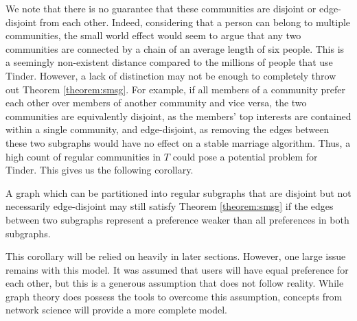 We note that there is no guarantee that these communities are disjoint or edge-disjoint from each other. Indeed, considering that a person can belong to multiple communities, the small world effect \citep{Newman2003} would seem to argue that any two communities are connected by a chain of an average length of six people. This is a seemingly non-existent distance compared to the millions of people that use Tinder. However, a lack of distinction may not be enough to completely throw out Theorem \ref{theorem:smsg}. For example, if all members of a community prefer each other over members of another community and vice versa, the two communities are equivalently disjoint, as the members' top interests are contained within a single community, and edge-disjoint, as removing the edges between these two subgraphs would have no effect on a stable marriage algorithm. Thus, a high count of regular communities in $T$ could pose a potential problem for Tinder. This gives us the following corollary.

\begin{corollary}
\label{corollary:subgraphs}
A graph which can be partitioned into regular subgraphs that are disjoint but not necessarily edge-disjoint may still satisfy Theorem \ref{theorem:smsg} if the edges between two subgraphs represent a preference weaker than all preferences in both subgraphs.
\end{corollary}

This corollary will be relied on heavily in later sections. However, one large issue remains with this model. It was assumed that users will have equal preference for each other, but this is a generous assumption that does not follow reality. While graph theory does possess the tools to overcome this assumption, concepts from network science will provide a more complete model.